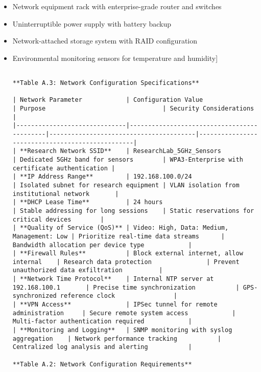 \documentclass[12pt,a4paper]{report}
\begin{document}
\begin{itemize}
\item Network equipment rack with enterprise-grade router and switches
\item Uninterruptible power supply with battery backup
\item Network-attached storage system with RAID configuration
\item Environmental monitoring sensors for temperature and humidity]
\begin{verbatim}

**Table A.3: Network Configuration Specifications**

| Network Parameter            | Configuration Value                        | Purpose                                | Security Considerations                         |
|------------------------------|--------------------------------------------|----------------------------------------|-------------------------------------------------|
| **Research Network SSID**    | ResearchLab_5GHz_Sensors                   | Dedicated 5GHz band for sensors        | WPA3-Enterprise with certificate authentication |
| **IP Address Range**         | 192.168.100.0/24                           | Isolated subnet for research equipment | VLAN isolation from institutional network       |
| **DHCP Lease Time**          | 24 hours                                   | Stable addressing for long sessions    | Static reservations for critical devices        |
| **Quality of Service (QoS)** | Video: High, Data: Medium, Management: Low | Prioritize real-time data streams      | Bandwidth allocation per device type            |
| **Firewall Rules**           | Block external internet, allow internal    | Research data protection               | Prevent unauthorized data exfiltration          |
| **Network Time Protocol**    | Internal NTP server at 192.168.100.1       | Precise time synchronization           | GPS-synchronized reference clock                |
| **VPN Access**               | IPSec tunnel for remote administration     | Secure remote system access            | Multi-factor authentication required            |
| **Monitoring and Logging**   | SNMP monitoring with syslog aggregation    | Network performance tracking           | Centralized log analysis and alerting           |

**Table A.2: Network Configuration Requirements**


\end{verbatim}
\end{itemize}
\end{document}
